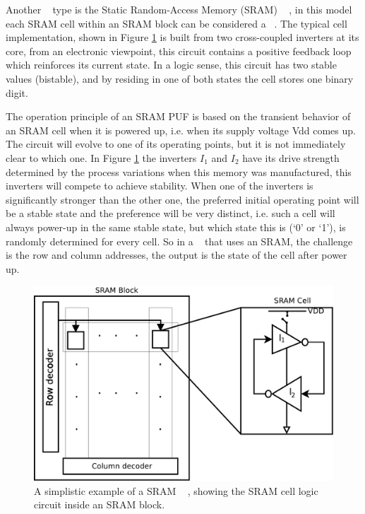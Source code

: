 Another \puf~ type is the Static Random-Access Memory (SRAM) \puf~ \cite{Leest2012}, in this model each SRAM cell within an SRAM block can be considered a \puf~. The typical cell implementation, shown in Figure \ref{fig:spufexample} is built from two cross-coupled inverters at its core, from an electronic viewpoint, this circuit contains a positive feedback loop which reinforces its current state. In a logic sense, this circuit has two stable values (bistable), and by residing in one of both states the cell stores one binary digit.

The operation principle of an SRAM PUF is based on the transient behavior of an SRAM cell when it is powered up, i.e. when its supply voltage Vdd comes up. The circuit will evolve to one of its operating points, but it is not immediately clear to which one. In Figure   \ref{fig:spufexample} the inverters $I_1$ and $I_2$ have its drive strength determined by the process variations when this memory was manufactured, this inverters will compete to achieve stability. When one of the inverters is significantly stronger than the other one, the preferred initial operating point will be a stable state and the preference will be very distinct, i.e. such a cell will always power-up in the same stable state, but which state this is (‘0’ or ‘1’), is randomly determined for every cell.
So in a \puf~ that uses an SRAM, the challenge is the row and column addresses, the output is the state of the cell after power up.
\begin{figure}[!ht]
	\centering
	\includegraphics[scale=0.42]{figures/pdf/spuf}
	\caption{A simplistic example of a SRAM \puf~ , showing the SRAM cell logic circuit inside an SRAM block.}
	\label{fig:spufexample}
\end{figure}


